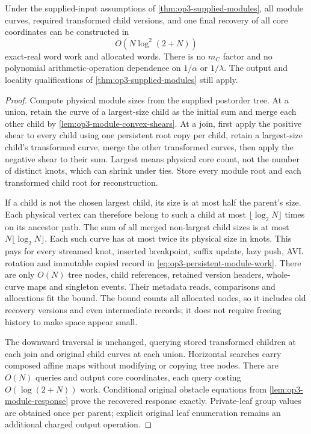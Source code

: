 \begin{theorem}
\label{thm:op3-persistent-modules}
Under the supplied-input assumptions of \cref{thm:op3-supplied-modules},
all module curves, required transformed child versions, and one final
recovery of all core coordinates can be constructed in
\begin{equation}
 O(N\log^2(2+N))
 \label{eq:op3-persistent-module-work}
\end{equation}
exact-real word work and allocated words. There is no $m_C$ factor and no
polynomial arithmetic-operation dependence on $1/\alpha$ or $1/\lambda$.
The output and locality qualifications of
\cref{thm:op3-supplied-modules} still apply.
\end{theorem}
\begin{proof}
Compute physical module sizes from the supplied postorder tree. At a
union, retain the curve of a largest-size child as the initial sum and
merge each other child by \cref{lem:op3-module-convex-shears}. At a
join, first apply the positive shear to every child using one persistent
root copy per child, retain a largest-size child's transformed curve,
merge the other transformed curves, then apply the negative shear to
their sum. Largest means physical core count, not the number of distinct
knots, which can shrink under ties. Store every module root and each
transformed child root for reconstruction.

If a child is not the chosen largest child, its size is at most half
the parent's size. Each physical vertex can therefore belong to such a
child at most $\lfloor\log_2N\rfloor$ times on its ancestor path.
The sum of all merged non-largest child sizes is at most
$N\lfloor\log_2N\rfloor$. Each such curve has at most twice its physical
size in knots. This pays for every streamed knot, inserted breakpoint,
suffix update, lazy push, AVL rotation and immutable copied record in
\cref{eq:op3-persistent-module-work}. There are only $O(N)$ tree nodes,
child references, retained version headers, whole-curve maps and singleton
events. Their metadata reads, comparisons and allocations fit the bound.
The bound counts all allocated nodes, so it includes old recovery
versions and even intermediate records; it does not require freeing
history to make space appear small.

The downward traversal is unchanged, querying stored transformed children
at each join and original child curves at each union. Horizontal searches
carry composed affine maps without modifying or copying tree nodes. There
are $O(N)$ queries and output core coordinates, each query costing
$O(\log(2+N))$ work. Conditional original obstacle equations from
\cref{lem:op3-module-response} prove the recovered response exactly.
Private-leaf group values are obtained once per parent; explicit original
leaf enumeration remains an additional charged output operation.


\end{proof}

